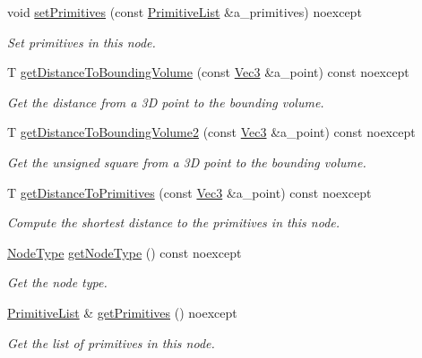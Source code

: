 \begin{DoxyCompactItemize}
void \hyperlink{classBVH_1_1NodeT_a2c9c3d3a83b3c1895c8f89b2bbd62e81}{set\+Primitives} (const \hyperlink{classBVH_1_1NodeT_a19cce6e7fbe85eccb4a3718dd69f49b7}{Primitive\+List} \&a\+\_\+primitives) noexcept
\begin{DoxyCompactList}\small\item\em Set primitives in this node. \end{DoxyCompactList}\item 
T \hyperlink{classBVH_1_1NodeT_a8da9f78078b0a579868d026bd61a2947}{get\+Distance\+To\+Bounding\+Volume} (const \hyperlink{classBVH_1_1NodeT_a6fbb4308c5c55ee170c5f992df7ae1d0}{Vec3} \&a\+\_\+point) const noexcept
\begin{DoxyCompactList}\small\item\em Get the distance from a 3D point to the bounding volume. \end{DoxyCompactList}\item 
T \hyperlink{classBVH_1_1NodeT_a06708a2711fd354a3c382da664cfe154}{get\+Distance\+To\+Bounding\+Volume2} (const \hyperlink{classBVH_1_1NodeT_a6fbb4308c5c55ee170c5f992df7ae1d0}{Vec3} \&a\+\_\+point) const noexcept
\begin{DoxyCompactList}\small\item\em Get the unsigned square from a 3D point to the bounding volume. \end{DoxyCompactList}\item 
T \hyperlink{classBVH_1_1NodeT_a61dc7040d57f0a69984548eb4804244b}{get\+Distance\+To\+Primitives} (const \hyperlink{classBVH_1_1NodeT_a6fbb4308c5c55ee170c5f992df7ae1d0}{Vec3} \&a\+\_\+point) const noexcept
\begin{DoxyCompactList}\small\item\em Compute the shortest distance to the primitives in this node. \end{DoxyCompactList}\item 
\hyperlink{namespaceBVH_a7613f83a60cfae9aba31861110bd9e54}{Node\+Type} \hyperlink{classBVH_1_1NodeT_a7b9e3a8bfa35f604298634da102a0ce4}{get\+Node\+Type} () const noexcept
\begin{DoxyCompactList}\small\item\em Get the node type. \end{DoxyCompactList}\item 
\hyperlink{classBVH_1_1NodeT_a19cce6e7fbe85eccb4a3718dd69f49b7}{Primitive\+List} \& \hyperlink{classBVH_1_1NodeT_adce9d9c6bd4ab3d613bef232353774f3}{get\+Primitives} () noexcept
\begin{DoxyCompactList}\small\item\em Get the list of primitives in this node. \end{DoxyCompactList}\item 

\end{DoxyCompactItemize}
